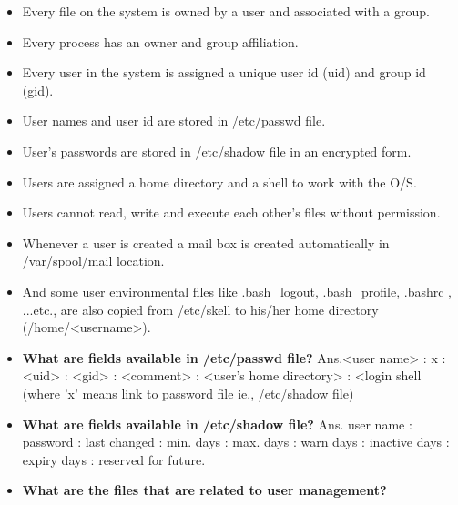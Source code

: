 \begin{enumerate}
\begin {itemize}
    \item Every file on the system is owned by a user and associated with a group.\newline
    \item Every process has an owner and group affiliation.\newline
    \item Every user in the system is assigned a unique user id (uid) and group id (gid).\newline
    \item User names and user id are stored in  /etc/passwd   file.\newline
    \item User's passwords are stored in  /etc/shadow  file in an encrypted form.\newline
    \item Users are assigned a home directory and a shell to work with the O/S.\newline
    \item Users cannot read, write and execute each other's files without permission.\newline
    \item Whenever a user is created a mail box is created automatically in /var/spool/mail  location.\newline
    \item And some user environmental files like  .bash_logout,  .bash_profile,  .bashrc ,  ...etc., are also copied from /etc/skell   to  his/her home directory (/home/<username>).\newline 
    \bigskip
    \bigskip
    \item \textbf{What are fields available in  /etc/passwd file?}\newline
          Ans.<user name>   :   x   :   <uid>   :   <gid>   :   <comment>   : \newline 
         <user's home directory>  :   <login shell\newline
         (where   'x'   means link to password file ie.,  /etc/shadow   file)\newline
    \bigskip
    \bigskip
    \item \textbf {What are fields available in  /etc/shadow  file?}\newline
          Ans. user name : password : last changed : min. days : max. days : warn days : inactive days : expiry days : reserved  for future.\newline
    \bigskip
    \bigskip
    \item\textbf {What are the files that are related to user management?}

\end{itemize}
\end{enumerate}
